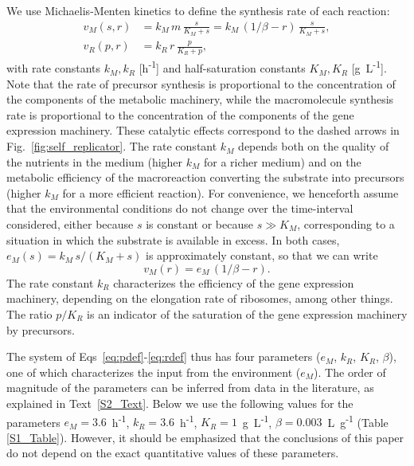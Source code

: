 We use Michaelis-Menten kinetics to define the synthesis rate of each reaction:
\begin{align}
v_M(s,r) &= k_M\,m\, \frac{s}{K_M + s} = k_M\,(1/\beta - r)\, \frac{s}{K_M + s},  \label{eq:metaflux} \\
v_R(p,r) &= k_R\,r\, \frac{p}{K_R + p}, \label{eq:machflux}
\end{align}
with rate constants $k_M, k_R$ [h\textsuperscript{-1}] and half-saturation constants $K_M, K_R$ [g~L\textsuperscript{-1}].
Note that the rate of precursor synthesis is proportional to the concentration of the components of the metabolic machinery, while the macromolecule synthesis rate is proportional to the concentration of the components of the gene expression machinery.
These catalytic effects correspond to the dashed arrows in Fig.~\ref{fig:self_replicator}.
The rate constant $k_M$ depends both on the quality of the nutrients in the medium (higher $k_M$ for a richer medium) and on the metabolic efficiency of the macroreaction converting the substrate into precursors (higher $k_M$ for a more efficient reaction).
For convenience, we henceforth assume that the environmental conditions do not change over the time-interval considered, either because $s$ is constant or because $s \gg K_M$, corresponding to a situation in which the substrate is available in excess.
In both cases, $e_M(s) = k_M\, s/(K_M + s)$ is approximately constant, so that we can write
\begin{equation}
\label{eq:metaflux_simplified}
v_M (r) = e_M \, (1/\beta-r).
\end{equation}
The rate constant $k_R$ characterizes the efficiency of the gene expression machinery, depending on the elongation rate of ribosomes, among other things. The ratio $p/K_R$ is an indicator of the saturation of the gene expression machinery by precursors.

The system of Eqs~\ref{eq:pdef}-\ref{eq:rdef} thus has four parameters ($e_M$, $k_R$, $K_R$, $\beta$), one of which characterizes the input from the environment ($e_M$).
The order of magnitude of the parameters can be inferred from data in the literature, as explained in Text~\ref{S2_Text}.
Below we use the following values for the parameters $e_M = 3.6$~h\textsuperscript{-1}, $k_R = 3.6$~h\textsuperscript{-1}, $K_R=1$~g~L\textsuperscript{-1}, $\beta = 0.003$~L~g\textsuperscript{-1} (Table \ref{S1_Table}).
However, it should be emphasized that the conclusions of this paper do not depend on the exact quantitative values of these parameters.

